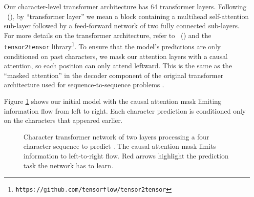 \documentclass[letterpaper]{article}
\newcommand{\newcite}[1]{\citeauthor{#1}~(\citeyear{#1})}
\begin{document}
Our character-level transformer architecture has 64 transformer layers.
Following \newcite{NIPS2017_7181}, by ``transformer layer'' we mean a block containing a multihead self-attention sub-layer followed by a feed-forward network of two fully connected sub-layers.
For more details on the transformer architecture, refer to \newcite{NIPS2017_7181} and the \texttt{tensor2tensor} library\footnote{\texttt{https://github.com/tensorflow/tensor2tensor}}.
To ensure that the model's predictions are only conditioned on past characters, we mask our attention layers with a causal attention, so each position can only attend leftward.
This is the same as the ``masked attention'' in the decoder component of the original transformer architecture used for sequence-to-sequence problems \cite{NIPS2017_7181}.

Figure \ref{figure:transformer} shows our initial model with the causal attention mask limiting information flow from left to right.
Each character prediction is conditioned only on the characters that appeared earlier.

\begin{figure}[htb]
  \centering
  \caption{Character transformer network of two layers processing a four character sequence to predict . The causal attention mask limits information to left-to-right flow. Red arrows highlight the prediction task the network has to learn.}
  \label{figure:transformer}
\end{figure} 
\end{document}
